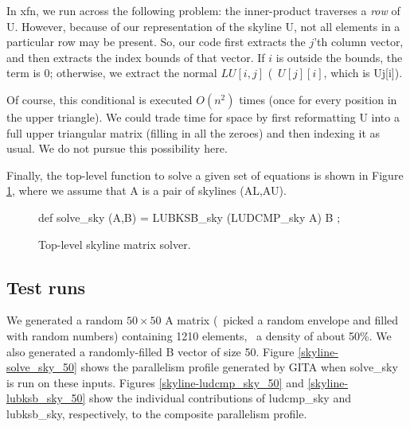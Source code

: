 In {\cf xfn}, we run across the following problem: the inner-product
traverses a {\em row\/} of {\cf U}.  However, because of our
representation of the skyline {\cf U}, not all elements in a
particular row may be present.  So, our code first extracts the $j$'th
column vector, and then extracts the index bounds of that vector.  If
$i$ is outside the bounds, the term is 0; otherwise, we extract the
normal $LU[i,j]$ (\ie\ $U[j][i]$, which is {\cf Uj[i]}).

Of course, this conditional is executed $O(n^2)$ times (once for every
position in the upper triangle).  We could trade time for space by
first reformatting {\cf U} into a full upper triangular matrix (filling
in all the zeroes) and then indexing it as usual.  We do not pursue
this possibility here.

Finally, the top-level function to solve a given set of equations is
shown in Figure \ref{solve-sky-program}, where we assume that {\cf A}
is a pair of skylines {\cf (AL,AU)}.

\begin{figure}[htbp]
 \hdivider
\begin{idenv}
def solve\_sky (A,B) = LUBKSB\_sky (LUDCMP\_sky A) B ;
\end{idenv}
 \caption{%
    \label{solve-sky-program}
    Top-level skyline matrix solver.
         }
 \hdivider
\end{figure}

\subsection{Test runs}

We generated a random $50 \times 50$ {\cf A} matrix (\ie\ picked a
random envelope and filled with random numbers) containing 1210
elements, \ie\ a density of about 50\%.  We also generated a
randomly-filled {\cf B} vector of size 50.  Figure
\ref{skyline-solve_sky_50} shows the parallelism profile generated by GITA
when {\cf solve\_sky} is run on these inputs.
Figures \ref{skyline-ludcmp_sky_50} and \ref{skyline-lubksb_sky_50}
show the individual contributions of {\cf ludcmp\_sky} and {\cf
lubksb\_sky}, respectively, to the composite parallelism profile.


 \begin{figure}[htbp]
 \end{figure}

